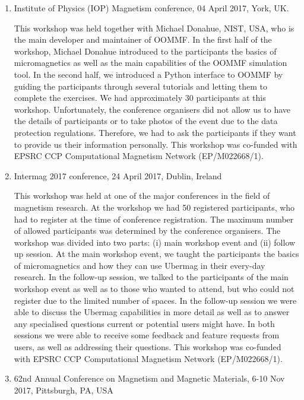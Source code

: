 \documentclass{deliverablereport}
\begin{document}
\begin{enumerate}

\item Institute of Physics (IOP) Magnetism conference, 04 April 2017,
York, UK.

  This workshop was held together with Michael Donahue, NIST, USA, who
is the main developer and maintainer of OOMMF. In the first half of
the workshop, Michael Donahue introduced to the participants the
basics of micromagnetics as well as the main capabilities of the OOMMF
simulation tool. In the second half, we introduced a Python interface
to OOMMF by guiding the participants through several tutorials and
letting them to complete the exercises. We had approximately 30
participants at this workshop. Unfortunately, the conference
organisers did not allow us to have the details of participants or to
take photos of the event due to the data protection
regulations. Therefore, we had to ask the participants if they want to
provide us their information personally. This workshop was co-funded
with EPSRC CCP Computational Magnetism Network (EP/M022668/1).

\item Intermag 2017 conference, 24 April 2017, Dublin, Ireland

  This workshop was held at one of the major conferences in the field
of magnetism research. At the workshop we had 50 registered
participants, who had to register at the time of conference
registration. The maximum number of allowed participants was
determined by the conference organisers. The workshop was divided into
two parts: (i) main workshop event and (ii) follow up session. At the
main workshop event, we taught the participants the basics of
micromagnetics and how they can use Ubermag in their every-day
research. In the follow-up session, we talked to the participants of
the main workshop event as well as to those who wanted to attend, but
who could not register due to the limited number of spaces. In the
follow-up session we were able to discuss the Ubermag capabilities in
more detail as well as to answer any specialised questions current or
potential users might have. In both sessions we were able to receive
some feedback and feature requests from users, as well as addressing
their questions. This workshop was
co-funded with EPSRC CCP Computational Magnetism Network
(EP/M022668/1).

\item 62nd Annual Conference on Magnetism and Magnetic Materials, 6-10
Nov 2017, Pittsburgh, PA, USA


\end{enumerate}
\end{document}
